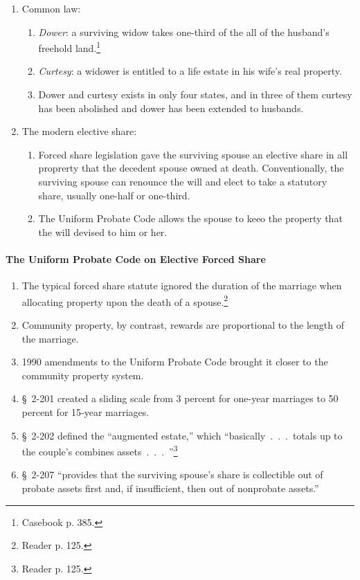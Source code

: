 \begin{enumerate}
    \item Common law:
    \begin{enumerate}
        \item \emph{Dower}: a surviving widow takes one-third of the all of 
        the husband's freehold land.\footnote{Casebook p. 385.}
        \item \emph{Curtesy}: a widower is entitled to a life estate in his 
        wife's real property.
        \item Dower and curtesy exists in only four states, and in three of 
        them curtesy has been abolished and dower has been extended to 
        husbands.
    \end{enumerate}
    \item The modern elective share:
    \begin{enumerate}
        \item Forced share legislation gave the surviving spouse an elective 
        share in all proprerty that the decedent spouse owned at death. 
        Conventionally, the surviving spouse can renounce the will and elect 
        to take a statutory share, usually one-half or one-third.
        \item The Uniform Probate Code allows the spouse to keeo the property 
        that the will devised to him or her.
    \end{enumerate}
\end{enumerate}

\paragraph{The Uniform Probate Code on Elective Forced Share}

\begin{enumerate}
    \item The typical forced share statute ignored the duration of the 
    marriage when allocating property upon the death of a 
    spouse.\footnote{Reader p. 125.}
    \item Community property, by contrast, rewards are proportional to the 
    length of the marriage.
    \item 1990 amendments to the Uniform Probate Code brought it closer to the 
    community property system.
    \item \S\ 2-201 created a sliding scale from 3 percent for one-year 
    marriages to 50 percent for 15-year marriages.
    \item \S\ 2-202 defined the ``augmented estate,'' which 
    ``basically~.~.~.~totals up to the couple's combines 
    assets~.~.~.~''\footnote{Reader p. 125.}
    \item \S\ 2-207 ``provides that the surviving spouse's share is 
    collectible out of probate assets first and, if insufficient, then out of 
    nonprobate assets.''
\end{enumerate}

